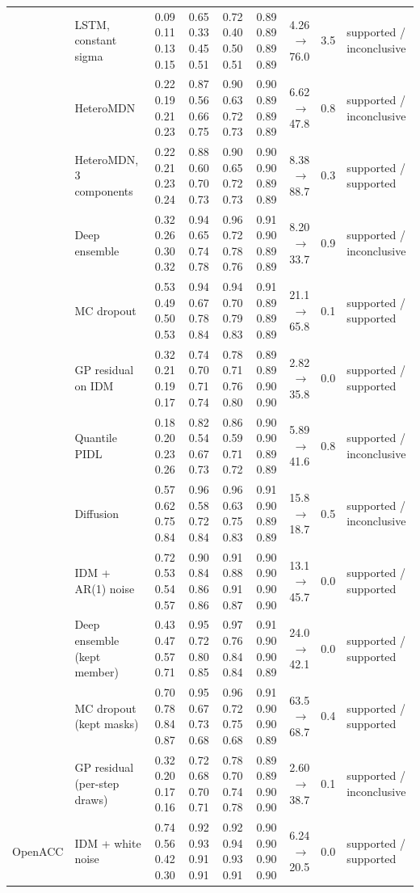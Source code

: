 \begin{longtable}{llrrrrrrl}
 & LSTM, constant sigma & 0.09 0.11 0.13 0.15 & 0.65 0.33 0.45 0.51 & 0.72 0.40 0.50 0.51 & 0.89 0.89 0.89 0.89 & 4.26 $\rightarrow$ 76.0 & 3.5 & supported / inconclusive \\
 & HeteroMDN & 0.22 0.19 0.21 0.23 & 0.87 0.56 0.66 0.75 & 0.90 0.63 0.72 0.73 & 0.90 0.89 0.89 0.89 & 6.62 $\rightarrow$ 47.8 & 0.8 & supported / inconclusive \\
 & HeteroMDN, 3 components & 0.22 0.21 0.23 0.24 & 0.88 0.60 0.70 0.73 & 0.90 0.65 0.72 0.73 & 0.90 0.90 0.89 0.89 & 8.38 $\rightarrow$ 88.7 & 0.3 & supported / supported \\
 & Deep ensemble & 0.32 0.26 0.30 0.32 & 0.94 0.65 0.74 0.78 & 0.96 0.72 0.78 0.76 & 0.91 0.90 0.89 0.89 & 8.20 $\rightarrow$ 33.7 & 0.9 & supported / inconclusive \\
 & MC dropout & 0.53 0.49 0.50 0.53 & 0.94 0.67 0.78 0.84 & 0.94 0.70 0.79 0.83 & 0.91 0.89 0.89 0.89 & 21.1 $\rightarrow$ 65.8 & 0.1 & supported / supported \\
 & GP residual on IDM & 0.32 0.21 0.19 0.17 & 0.74 0.70 0.71 0.74 & 0.78 0.71 0.76 0.80 & 0.89 0.89 0.90 0.90 & 2.82 $\rightarrow$ 35.8 & 0.0 & supported / supported \\
 & Quantile PIDL & 0.18 0.20 0.23 0.26 & 0.82 0.54 0.67 0.73 & 0.86 0.59 0.71 0.72 & 0.90 0.90 0.89 0.89 & 5.89 $\rightarrow$ 41.6 & 0.8 & supported / inconclusive \\
 & Diffusion & 0.57 0.62 0.75 0.84 & 0.96 0.58 0.72 0.84 & 0.96 0.63 0.75 0.83 & 0.91 0.90 0.89 0.89 & 15.8 $\rightarrow$ 18.7 & 0.5 & supported / inconclusive \\
 & IDM + AR(1) noise & 0.72 0.53 0.54 0.57 & 0.90 0.84 0.86 0.86 & 0.91 0.88 0.91 0.87 & 0.90 0.90 0.90 0.90 & 13.1 $\rightarrow$ 45.7 & 0.0 & supported / supported \\
 & Deep ensemble (kept member) & 0.43 0.47 0.57 0.71 & 0.95 0.72 0.80 0.85 & 0.97 0.76 0.84 0.84 & 0.91 0.90 0.90 0.89 & 24.0 $\rightarrow$ 42.1 & 0.0 & supported / supported \\
 & MC dropout (kept masks) & 0.70 0.78 0.84 0.87 & 0.95 0.67 0.73 0.68 & 0.96 0.72 0.75 0.68 & 0.91 0.90 0.90 0.89 & 63.5 $\rightarrow$ 68.7 & 0.4 & supported / supported \\
 & GP residual (per-step draws) & 0.32 0.20 0.17 0.16 & 0.72 0.68 0.70 0.71 & 0.78 0.70 0.74 0.78 & 0.89 0.89 0.90 0.90 & 2.60 $\rightarrow$ 38.7 & 0.1 & supported / inconclusive \\
\midrule
OpenACC & IDM + white noise & 0.74 0.56 0.42 0.30 & 0.92 0.93 0.91 0.91 & 0.92 0.94 0.93 0.91 & 0.90 0.90 0.90 0.90 & 6.24 $\rightarrow$ 20.5 & 0.0 & supported / supported \\

\end{longtable}

